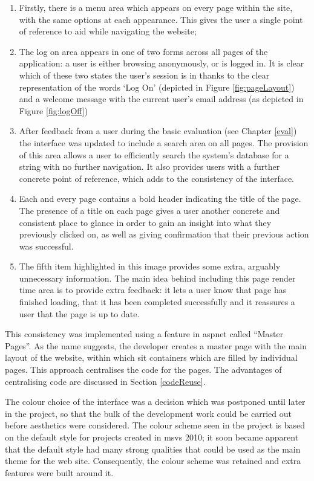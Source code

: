 \begin{enumerate}
	\item Firstly, there is a menu area which appears on every page within the site, with the same options at each appearance.  This gives the user a single point of reference to aid while navigating the website;
	\item The log on area appears in one of two forms across all pages of the application: a user is either browsing anonymously, or is logged in.  It is clear which of these two states the user's session is in thanks to the clear representation of the words `Log On' (depicted in Figure \ref{fig:pageLayout}) and a welcome message with the current user's email address (as depicted in Figure \ref{fig:logOff})
	\item After feedback from a user during the basic evaluation (see Chapter \ref{eval}) the interface was updated to include a search area on all pages.  The provision of this area allows a user to efficiently search the system's database for a string with no further navigation.  It also provides users with a further concrete point of reference, which adds to the consistency of the interface.
	\item Each and every page contains a bold header indicating the title of the page.  The presence of a title on each page gives a user another concrete and consistent place to glance in order to gain an insight into what they previously clicked on, as well as giving confirmation that their previous action was successful.
	\item The fifth item highlighted in this image provides some extra, arguably unnecessary information.  The main idea behind including this page render time area is to provide extra feedback: it lets a user know that page has finished loading, that it has been completed successfully and it reassures a user that the page is up to date.
\end{enumerate}

This consistency was implemented using a feature in \gls{asp}\gls{net} called ``Master Pages''.  As the name suggests, the developer creates a master page with the main layout of the website, within which sit containers which are filled by individual pages.  This approach centralises the code for the pages.  The advantages of centralising code are discussed in Section \ref{codeReuse}.

The colour choice of the interface was a decision which was postponed until later in the project, so that the bulk of the development work could be carried out before aesthetics were considered.  The colour scheme seen in the project is based on the default style for projects created in \gls{msvs} 2010; it soon became apparent that the default style had many strong qualities that could be used as the main theme for the web site.  Consequently, the colour scheme was retained and extra features were built around it.



